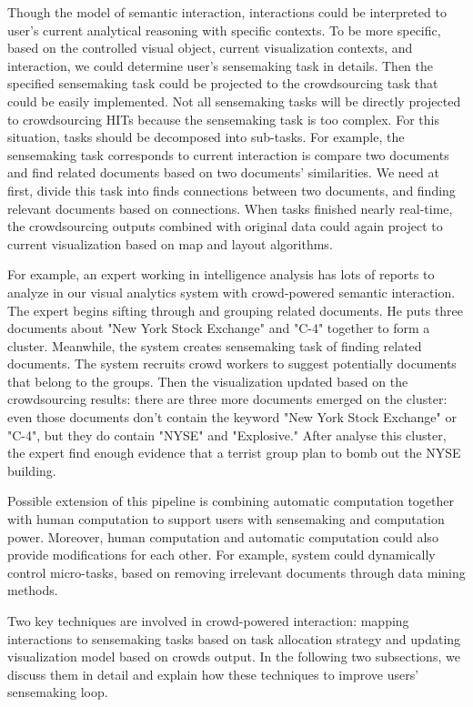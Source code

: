 \documentclass[journal]{vgtc}                %
\begin{document}
Though the model of semantic interaction, interactions could be interpreted to user's current analytical reasoning with specific contexts. To be more specific, based on the controlled visual object, current visualization contexts, and interaction, we could determine user's sensemaking task in details. Then the specified sensemaking task could be projected to the crowdsourcing task that could be easily implemented. Not all sensemaking tasks will be directly projected to crowdsourcing HITs because the sensemaking task is too complex. For this situation, tasks should be decomposed into sub-tasks. For example, the sensemaking task corresponds to current interaction is compare two documents and find related documents based on two documents' similarities. We need at first, divide this task into finds connections between two documents, and finding relevant documents based on connections. When tasks finished nearly real-time, the crowdsourcing outputs combined with original data could again project to current visualization based on map and layout algorithms.

For example, an expert working in intelligence analysis has lots of reports to analyze in our visual analytics system with crowd-powered semantic interaction. The expert begins sifting through and grouping related documents. He puts three documents about "New York Stock Exchange" and "C-4" together to form a cluster. Meanwhile, the system creates sensemaking task of finding related documents. The system recruits crowd workers to suggest potentially documents that belong to the groups. Then the visualization updated based on the crowdsourcing results: there are three more documents emerged on the cluster: even those documents don't contain the keyword "New York Stock Exchange" or "C-4", but they do contain "NYSE" and "Explosive." After analyse this cluster, the expert find enough evidence that a terrist group plan to bomb out the NYSE building.

Possible extension of this pipeline is combining automatic computation together with human computation to support users with sensemaking and computation power. Moreover, human computation and automatic computation could also provide modifications for each other. For example, system could dynamically control micro-tasks, based on removing irrelevant documents through data mining methods.


Two key techniques are involved in crowd-powered interaction: mapping interactions to sensemaking tasks based on task allocation strategy and updating visualization model based on crowds output. In the following two subsections, we discuss them in detail and explain how these techniques to improve users' sensemaking loop.
\end{document}
